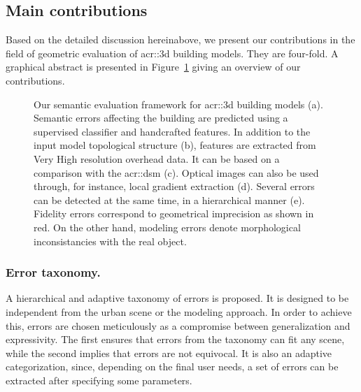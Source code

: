     \subsection{Main contributions}
        \label{sec::introduction::contributions::contributions}
        Based on the detailed discussion hereinabove, we present our contributions in the field of geometric evaluation of \gls{acr::3d} building models.
        They are four-fold.
        A graphical abstract is presented in Figure~\ref{fig::graphical_abstract} giving an overview of our contributions.
        \begin{figure}[htb]
            \centering
                        
            \caption[
                Our semantic evaluation framework for \acrshort*{acr::3d} building models.
            ]{
                \label{fig::graphical_abstract} Our semantic evaluation framework for \gls{acr::3d} building models (a).
                Semantic errors affecting the building are predicted using a supervised classifier and handcrafted features.
                In addition to the input model topological structure (b), features are extracted from Very High resolution overhead data.
                It can be based on a comparison with the \gls*{acr::dsm} (c).
                Optical images can also be used through, for instance, local gradient extraction (d).
                Several errors can be detected at the same time, in a hierarchical manner (e).
                Fidelity errors correspond to geometrical imprecision as shown in red.
                On the other hand, modeling errors denote morphological inconsistancies with the real object.
            }
        \end{figure}
        \subsubsection{Error taxonomy.}
            A hierarchical and adaptive taxonomy of errors is proposed.
            It is designed to be independent from the urban scene or the modeling approach.
            In order to achieve this, errors are chosen meticulously as a compromise between generalization and expressivity.
            The first ensures that errors from the taxonomy can fit any scene, while the second implies that errors are not equivocal.
            It is also an adaptive categorization, since, depending on the final user needs, a set of errors can be extracted after specifying some parameters.
            
